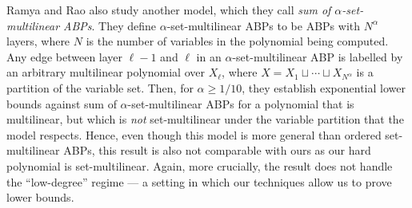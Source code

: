 \documentclass{article}
\begin{document}
Ramya and Rao \cite{RR20} also study another model, which they call \emph{sum of $\alpha$-set-multilinear ABPs}. 
They define $\alpha$-set-multilinear ABPs to be ABPs with $N^{\alpha}$ layers, where $N$ is the number of variables in the polynomial being computed.
Any edge between layer $\ell-1$ and $\ell$ in an $\alpha$-set-multilinear ABP is labelled by an arbitrary multilinear polynomial over $X_\ell$, where $X = X_1 \sqcup \cdots \sqcup X_{N^\alpha}$ is a partition of the variable set. 
Then, for $\alpha \geq 1/10$, they establish exponential lower bounds against sum of $\alpha$-set-multilinear ABPs for a polynomial that is multilinear, but which is \emph{not} set-multilinear under the variable partition that the model respects.
Hence, even though this model is more general than ordered set-multilinear ABPs, this result \cite[Theorem 3]{RR20} is also not comparable with ours as
our hard polynomial is set-multilinear.
Again, more crucially, the result \cite[Theorem 3]{RR20} does not handle the ``low-degree'' regime --- a setting in which our techniques allow us to prove lower bounds.

\end{document}
